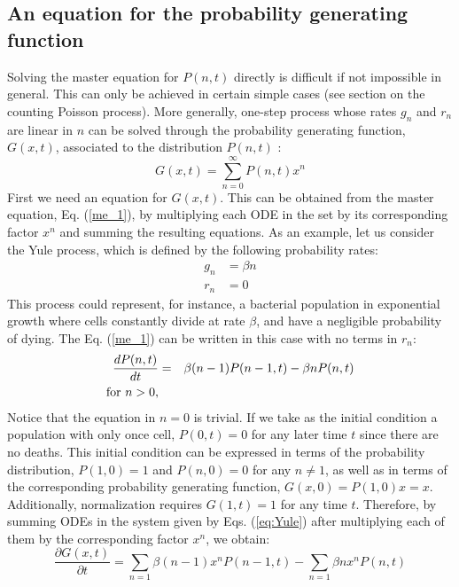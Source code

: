 \subsection{An equation for the probability generating function}
Solving the master equation for $P(n,t)$ directly is difficult if not impossible in general. This can only be achieved in certain simple cases (see section on the counting Poisson process). More generally, one-step process 
whose rates $g_n$ and $r_n$ are linear in $n$ can be solved through the probability generating function, $G(x,t)$, associated to the distribution $P(n,t)$ \citep{Barlett60}:
\begin{equation}
G(x,t) = \sum_{n=0}^{\infty} P(n,t) x^n
\end{equation}
First we need an equation for $G(x,t)$. This can be obtained from the master equation, Eq. (\ref{me_1}), by multiplying each ODE in the set by its corresponding factor $x^n$ and summing the resulting equations. As an example, let us consider the Yule process, which is defined by the following probability rates:
\begin{align*}
g_n & = \beta n\\
r_n & = 0
\end{align*}
This process could represent, for instance, a bacterial population in exponential growth where cells constantly divide at rate $\beta$, and have a negligible probability of dying. The Eq. (\ref{me_1}) can be written in this case with no terms in $r_n$:    
\begin{eqnarray}
\frac{dP(n,t)}{dt}            & = & \beta (n-1) P(n-1,t) - \beta n P(n,t)         \nonumber \\
\textup{for} \,\, n > 0,      &   &                                               \label{eq:Yule}
\end{eqnarray}
Notice that the equation in $n=0$ is trivial. If we take as the initial condition a population with only once cell, $P(0,t) = 0$ for any later time $t$ since there are no deaths. This initial condition can be expressed in terms of the probability distribution, $P(1,0)=1$ and $P(n,0)=0$ for any $n \not = 1$, as well as in terms of the corresponding probability generating function, $G(x,0) = P(1,0) x = x$. Additionally, normalization requires $G(1,t) = 1$ for any time $t$. Therefore, by summing ODEs in the system given by Eqs. (\ref{eq:Yule}) after multiplying each of them by the corresponding factor $x^n$, we obtain:
\begin{equation}
\frac{\partial G(x,t)}{\partial t} = \sum_{n=1} \beta (n-1) x^n P(n-1,t) - \sum_{n=1} \beta n x^n P(n,t)
\end{equation}
